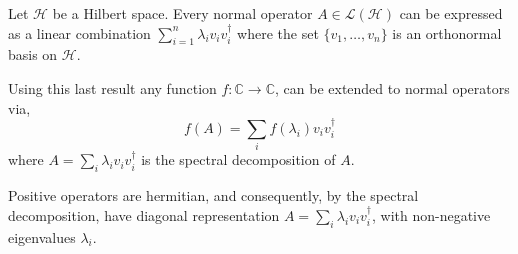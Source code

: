 \begin{theorem}  \cite[Corollary 1.4]{watrous2018theory}
  Let $\mathcal{H}$ be a Hilbert space. Every normal operator $A \in \mathcal{L}(\mathcal{H})$ can be expressed as a linear combination $\sum_{i=1}^n \lambda_{i}v_{i}v_{i}^{\dag}$ where the set $\{v_{1}, \ldots , v_{n}\}$ is an orthonormal basis on $\mathcal{H}$.
\end{theorem}

Using this last result any function $f:\mathbb{C} \xrightarrow{} \mathbb{C}$, can be extended to normal operators via,
  \begin{equation} \label{eq:apply_f_diag} 
    f(A) = \sum_{i} f(\lambda_{i})v_{i}v_{i}^{\dag}
\end {equation}
where $A = \sum_{i} \lambda_{i}v_{i}v_{i}^{\dag}$ is the spectral decomposition of $A$.


Positive operators are hermitian, and consequently, by the spectral decomposition, have diagonal representation $A =  \sum_i \lambda_i v_i v_i^{\dag}$, with non-negative eigenvalues $\lambda_i$.

